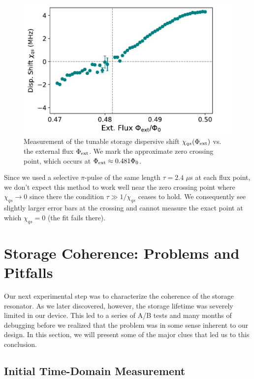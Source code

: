 \begin{figure}[h]
    \centering
    \includegraphics[width=0.6\linewidth]{Figures/4/tunable_chi.pdf}
    \caption{Measurement of the tunable storage dispersive shift $\chi_{qs}(\Phi_{\rm ext})$ vs. the external flux $\Phi_{\rm ext}$. We mark the approximate zero crossing point, which occurs at $\Phi_{\rm ext} \approx 0.481\Phi_0$.}
    \label{fig:4_tunable_chi}
\end{figure}

\noindent Since we used a selective $\pi$-pulse of the same length $\tau = 2.4$ $\mu$s at each flux point, we don't expect this method to work well near the zero crossing point where $\chi_{qs} \to 0$ since there the condition $\tau \gg 1/\chi_{qs}$ ceases to hold. We consequently see slightly larger error bars at the crossing and cannot measure the exact point at which $\chi_{qs}=0$ (the fit fails there). 

\clearpage

\section{Storage Coherence: Problems and Pitfalls \label{sec:4_StorageCoherenceProblems}}

Our next experimental step was to characterize the coherence of the storage resonator. As we later discovered, however, the storage lifetime was severely limited in our device. This led to a series of A/B tests and many months of debugging before we realized that the problem was in some sense inherent to our design. In this section, we will present some of the major clues that led us to this conclusion. 

\subsection{Initial Time-Domain Measurement}

